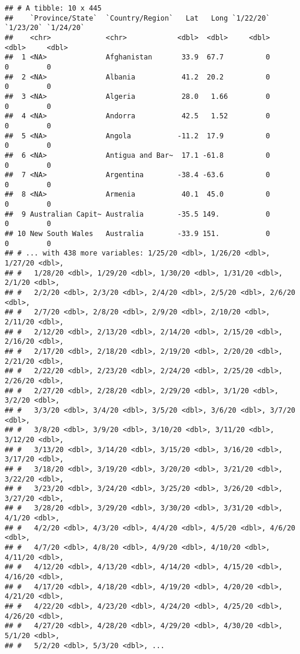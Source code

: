 \documentclass[]{tufte-handout}
\begin{document}
\begin{verbatim}
## # A tibble: 10 x 445
##    `Province/State`  `Country/Region`   Lat   Long `1/22/20` `1/23/20` `1/24/20`
##    <chr>             <chr>            <dbl>  <dbl>     <dbl>     <dbl>     <dbl>
##  1 <NA>              Afghanistan       33.9  67.7          0         0         0
##  2 <NA>              Albania           41.2  20.2          0         0         0
##  3 <NA>              Algeria           28.0   1.66         0         0         0
##  4 <NA>              Andorra           42.5   1.52         0         0         0
##  5 <NA>              Angola           -11.2  17.9          0         0         0
##  6 <NA>              Antigua and Bar~  17.1 -61.8          0         0         0
##  7 <NA>              Argentina        -38.4 -63.6          0         0         0
##  8 <NA>              Armenia           40.1  45.0          0         0         0
##  9 Australian Capit~ Australia        -35.5 149.           0         0         0
## 10 New South Wales   Australia        -33.9 151.           0         0         0
## # ... with 438 more variables: 1/25/20 <dbl>, 1/26/20 <dbl>, 1/27/20 <dbl>,
## #   1/28/20 <dbl>, 1/29/20 <dbl>, 1/30/20 <dbl>, 1/31/20 <dbl>, 2/1/20 <dbl>,
## #   2/2/20 <dbl>, 2/3/20 <dbl>, 2/4/20 <dbl>, 2/5/20 <dbl>, 2/6/20 <dbl>,
## #   2/7/20 <dbl>, 2/8/20 <dbl>, 2/9/20 <dbl>, 2/10/20 <dbl>, 2/11/20 <dbl>,
## #   2/12/20 <dbl>, 2/13/20 <dbl>, 2/14/20 <dbl>, 2/15/20 <dbl>, 2/16/20 <dbl>,
## #   2/17/20 <dbl>, 2/18/20 <dbl>, 2/19/20 <dbl>, 2/20/20 <dbl>, 2/21/20 <dbl>,
## #   2/22/20 <dbl>, 2/23/20 <dbl>, 2/24/20 <dbl>, 2/25/20 <dbl>, 2/26/20 <dbl>,
## #   2/27/20 <dbl>, 2/28/20 <dbl>, 2/29/20 <dbl>, 3/1/20 <dbl>, 3/2/20 <dbl>,
## #   3/3/20 <dbl>, 3/4/20 <dbl>, 3/5/20 <dbl>, 3/6/20 <dbl>, 3/7/20 <dbl>,
## #   3/8/20 <dbl>, 3/9/20 <dbl>, 3/10/20 <dbl>, 3/11/20 <dbl>, 3/12/20 <dbl>,
## #   3/13/20 <dbl>, 3/14/20 <dbl>, 3/15/20 <dbl>, 3/16/20 <dbl>, 3/17/20 <dbl>,
## #   3/18/20 <dbl>, 3/19/20 <dbl>, 3/20/20 <dbl>, 3/21/20 <dbl>, 3/22/20 <dbl>,
## #   3/23/20 <dbl>, 3/24/20 <dbl>, 3/25/20 <dbl>, 3/26/20 <dbl>, 3/27/20 <dbl>,
## #   3/28/20 <dbl>, 3/29/20 <dbl>, 3/30/20 <dbl>, 3/31/20 <dbl>, 4/1/20 <dbl>,
## #   4/2/20 <dbl>, 4/3/20 <dbl>, 4/4/20 <dbl>, 4/5/20 <dbl>, 4/6/20 <dbl>,
## #   4/7/20 <dbl>, 4/8/20 <dbl>, 4/9/20 <dbl>, 4/10/20 <dbl>, 4/11/20 <dbl>,
## #   4/12/20 <dbl>, 4/13/20 <dbl>, 4/14/20 <dbl>, 4/15/20 <dbl>, 4/16/20 <dbl>,
## #   4/17/20 <dbl>, 4/18/20 <dbl>, 4/19/20 <dbl>, 4/20/20 <dbl>, 4/21/20 <dbl>,
## #   4/22/20 <dbl>, 4/23/20 <dbl>, 4/24/20 <dbl>, 4/25/20 <dbl>, 4/26/20 <dbl>,
## #   4/27/20 <dbl>, 4/28/20 <dbl>, 4/29/20 <dbl>, 4/30/20 <dbl>, 5/1/20 <dbl>,
## #   5/2/20 <dbl>, 5/3/20 <dbl>, ...
\end{verbatim}
\end{document}
